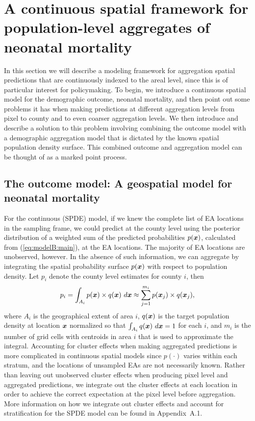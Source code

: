 \documentclass[12pt]{article}
\newcommand{\bmx}{\mbox{\boldmath $x$}}
\begin{document}
\section{A continuous spatial framework for population-level aggregates of neonatal mortality}

In this section we will describe a modeling framework for aggregation spatial predictions that are continuously indexed to the areal level, since this is of particular interest for policymaking. To begin, we introduce a continuous spatial model for the demographic outcome, neonatal mortality, and then point out some problems it has when making predictions at different aggregation levels from pixel to county and to even coarser aggregation levels. We then introduce and describe a solution to this problem involving combining the outcome model with a demographic aggregation model that is dictated by the known spatial population density surface. This combined outcome and aggregation model can be thought of as a marked point process.

\subsection{The outcome model: A geospatial model for neonatal mortality}

For the continuous (SPDE) model, if we knew the complete list of EA locations in the sampling frame, we could predict at the county level using the posterior distribution of a weighted sum of the predicted probabilities $p(\bmx)$, calculated from (\ref{eq:modelB:main}), at the EA locations. The majority of EA locations are unobserved, however. In the absence of such information, we can aggregate by integrating the spatial probability surface $p(\bmx)$ with respect to population density. Let $p_i$ denote the county level estimates for county $i$, then
\begin{equation}
p_i = \int_{A_i} p(\bmx) \times q(\bmx) ~ d\bmx \approx \sum_{j=1}^{m_i} p(\bmx_j) \times q(\bmx_j),
\label{eq:popDensityIntegral}
\end{equation}
where $A_i$ is the geographical extent of area $i$, $q(\bmx)$ is the target population density at location $\bmx$ normalized so that $\int_{A_i} q(\bmx) \ d\bmx = 1$ for each $i$, and $m_i$ is the number of grid cells with centroids in area $i$ that is used to approximate the integral. Accounting for cluster effects when making aggregated predictions is more complicated in continuous spatial models since $p(  \cdot )$ varies within each stratum, and the locations of unsampled EAs are not necessarily known. Rather than leaving out unobserved cluster effects when producing pixel level and aggregated predictions, we integrate out the cluster effects at each location in order to achieve the correct expectation at the pixel level before aggregation. More information on how we integrate out cluster effects and account for stratification for the SPDE model can be found in Appendix~A.1.
\end{document}
